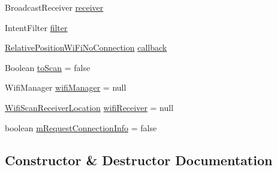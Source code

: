 \begin{DoxyCompactItemize}
\item 
Broadcast\+Receiver \hyperlink{classcs_1_1usense_1_1location_1_1_wifi_access_point_ac042464a16fe1ff488c047e496c1b7cc}{receiver}
\item 
Intent\+Filter \hyperlink{classcs_1_1usense_1_1location_1_1_wifi_access_point_a13087cbf9ffe03dae9056dca35ee703d}{filter}
\item 
\hyperlink{classcs_1_1usense_1_1location_1_1_relative_position_wi_fi_no_connection}{Relative\+Position\+Wi\+Fi\+No\+Connection} \hyperlink{classcs_1_1usense_1_1location_1_1_wifi_access_point_a82f3956b7d04dc3094a2be54f0d4fde4}{callback}
\item 
Boolean \hyperlink{classcs_1_1usense_1_1location_1_1_wifi_access_point_adc62ce55e5cb4824ae41777bc60a5ef5}{to\+Scan} = false
\item 
Wifi\+Manager \hyperlink{classcs_1_1usense_1_1location_1_1_wifi_access_point_a45e15d0b01c86dea95b0fdc0aab838e3}{wifi\+Manager} = null
\item 
\hyperlink{classcs_1_1usense_1_1location_1_1_wifi_access_point_1_1_wifi_scan_receiver_location}{Wifi\+Scan\+Receiver\+Location} \hyperlink{classcs_1_1usense_1_1location_1_1_wifi_access_point_a0bbe319038518690675af07a94c5d419}{wifi\+Receiver} = null
\item 
boolean \hyperlink{classcs_1_1usense_1_1location_1_1_wifi_access_point_a7206a0c3b5324062f6c2685f493904be}{m\+Request\+Connection\+Info} = false
\end{DoxyCompactItemize}


\subsection{Constructor \& Destructor Documentation}
\hypertarget{classcs_1_1usense_1_1location_1_1_wifi_access_point_aa3fc382e38fa0c62693dddefd3700edf}{}
